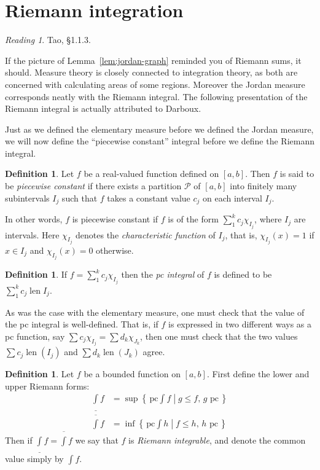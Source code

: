 \documentclass[11pt,oneside]{amsbook}
\newcommand{\set}[1]{\left\{\,#1\,\right\}}
\DeclareMathOperator{\len}{len}
\newcommand{\lint}{\underline\int}
\newcommand{\ovint}{\overline\int}
\theoremstyle{definition}
\theoremstyle{plain}
\theoremstyle{definition}
\newtheorem{defn}[thm]{Definition}
\theoremstyle{remark}
\newtheorem*{reading}{Reading}
\numberwithin{equation}{section}
\numberwithin{figure}{section}
\begin{document}
\newpage
\section{Riemann integration}

\begin{reading}
  Tao, \S1.1.3.
\end{reading}

If the picture of Lemma~\ref{lem:jordan-graph} reminded you of Riemann sums, it should. Measure theory is closely connected to integration theory, as both are concerned with calculating areas of some regions. Moreover the Jordan measure corresponds neatly with the Riemann integral. The following presentation of the Riemann integral is actually attributed to Darboux.

Just as we defined the elementary measure before we defined the Jordan measure, we will now define the ``piecewise constant'' integral before we define the Riemann integral.

\begin{defn}
  Let $f$ be a real-valued function defined on $[a,b]$. Then $f$ is said to be \emph{piecewise constant} if there exists a partition $\mathcal P$ of $[a,b]$ into finitely many subintervals $I_j$ such that $f$ takes a constant value $c_j$ on each interval $I_j$.
\end{defn}

In other words, $f$ is piecewise constant if $f$ is of the form $\sum_1^k c_j\chi_{I_j}$, where $I_j$ are intervals. Here $\chi_{I_j}$ denotes the \emph{characteristic function} of $I_j$, that is, $\chi_{I_j}(x)=1$ if $x\in I_j$ and $\chi_{I_j}(x)=0$ otherwise.

\begin{defn}
  If $f=\sum_1^kc_j\chi_{I_j}$ then the \emph{pc integral} of $f$ is defined to be $\sum_1^kc_j\len I_j$.
\end{defn}

As was the case with the elementary measure, one must check that the value of the pc integral is well-defined. That is, if $f$ is expressed in two different ways as a pc function, say $\sum c_j\chi_{I_j}=\sum d_k\chi_{J_k}$, then one must check that the two values $\sum c_j\len(I_j)$ and $\sum d_k\len(J_k)$ agree.

\begin{defn}
  Let $f$ be a bounded function on $[a,b]$. First define the lower and upper Riemann forms:
  \begin{align*}
    \lint f&=\sup\set{\left.\text{pc}\!\!\int\!\! f\;\right|\;g\leq f\text{, $g$ pc}}\\
    \ovint f&=\inf\set{\left.\text{pc}\!\!\int\!\! h\;\right|\;f\leq h\text{, $h$ pc}}
  \end{align*}
  Then if $\lint f=\ovint f$ we say that $f$ is \emph{Riemann integrable}, and denote the common value simply by $\int f$.
\end{defn}
\end{document}
